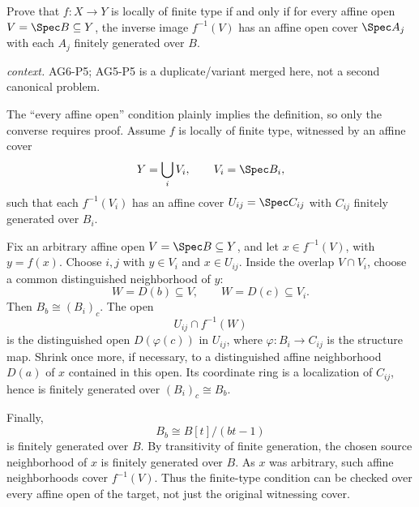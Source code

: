 \begin{problem}\label{prob:vi26-p02}
Prove that \(f:X\to Y\) is locally of finite type if and only if for every affine open \(V=\Spec B\subseteq Y\), the inverse image \(f^{-1}(V)\) has an affine open cover \(\Spec A_j\) with each \(A_j\) finitely generated over \(B\).
\par\smallskip\noindent\textit{context.} AG6-P5; AG5-P5 is a duplicate/variant merged here, not a second canonical problem.
\end{problem}

\ifdefined\FullProblemDossiers
\begin{solution}
The ``every affine open'' condition plainly implies the definition, so only the converse requires
proof.  Assume \(f\) is locally of finite type, witnessed by an affine cover
\[
Y=\bigcup_i V_i,\qquad V_i=\Spec B_i,
\]
such that each \(f^{-1}(V_i)\) has an affine cover \(U_{ij}=\Spec C_{ij}\) with \(C_{ij}\) finitely
generated over \(B_i\).

Fix an arbitrary affine open \(V=\Spec B\subseteq Y\), and let \(x\in f^{-1}(V)\), with
\(y=f(x)\).  Choose \(i,j\) with \(y\in V_i\) and \(x\in U_{ij}\).  Inside the overlap
\(V\cap V_i\), choose a common distinguished neighborhood of \(y\):
\[
W=D(b)\subseteq V,\qquad W=D(c)\subseteq V_i.
\]
Then \(B_b\cong (B_i)_c\).  The open
\[
U_{ij}\cap f^{-1}(W)
\]
is the distinguished open \(D(\varphi(c))\) in \(U_{ij}\), where \(\varphi:B_i\to C_{ij}\) is the
structure map.  Shrink once more, if necessary, to a distinguished affine neighborhood
\(D(a)\) of \(x\) contained in this open.  Its coordinate ring is a localization of \(C_{ij}\),
hence is finitely generated over \((B_i)_c\cong B_b\).

Finally,
\[
B_b\cong B[t]/(bt-1)
\]
is finitely generated over \(B\).  By transitivity of finite generation, the chosen source
neighborhood of \(x\) is finitely generated over \(B\).  As \(x\) was arbitrary, such affine
neighborhoods cover \(f^{-1}(V)\).  Thus the finite-type condition can be checked over every affine
open of the target, not just the original witnessing cover.
\end{solution}
\fi
